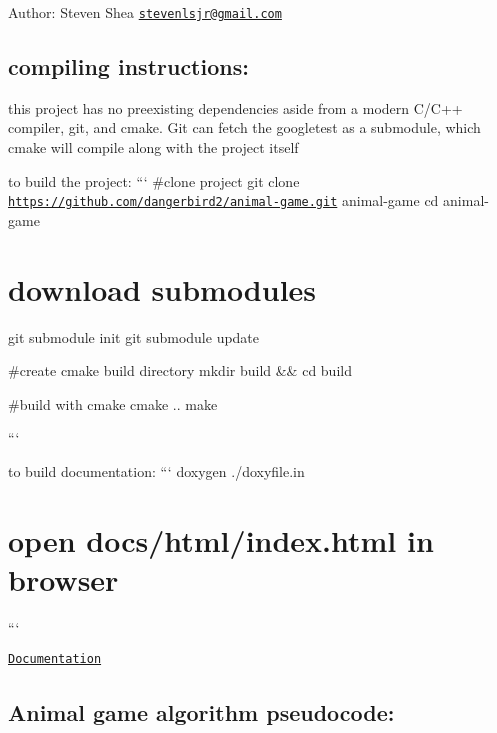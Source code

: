 Author\+: Steven Shea \href{mailto:stevenlsjr@gmail.com}{\tt stevenlsjr@gmail.\+com}

\subsection*{compiling instructions\+: }

this project has no preexisting dependencies aside from a modern C/\+C++ compiler, git, and cmake. Git can fetch the googletest as a submodule, which cmake will compile along with the project itself

to build the project\+: ``` \#clone project git clone \href{https://github.com/dangerbird2/animal-game.git}{\tt https\+://github.\+com/dangerbird2/animal-\/game.\+git} animal-\/game cd animal-\/game

\section*{download submodules}

git submodule init git submodule update

\#create cmake build directory mkdir build \&\& cd build

\#build with cmake cmake .. make

```

to build documentation\+: ``` doxygen ./doxyfile.in \section*{open docs/html/index.\+html in browser}

```


\begin{DoxyItemize}
\item \href{http://dangerbird2.github.io/animal-game/docs/html/}{\tt Documentation}
\end{DoxyItemize}

\subsection*{Animal game algorithm pseudocode\+: }


